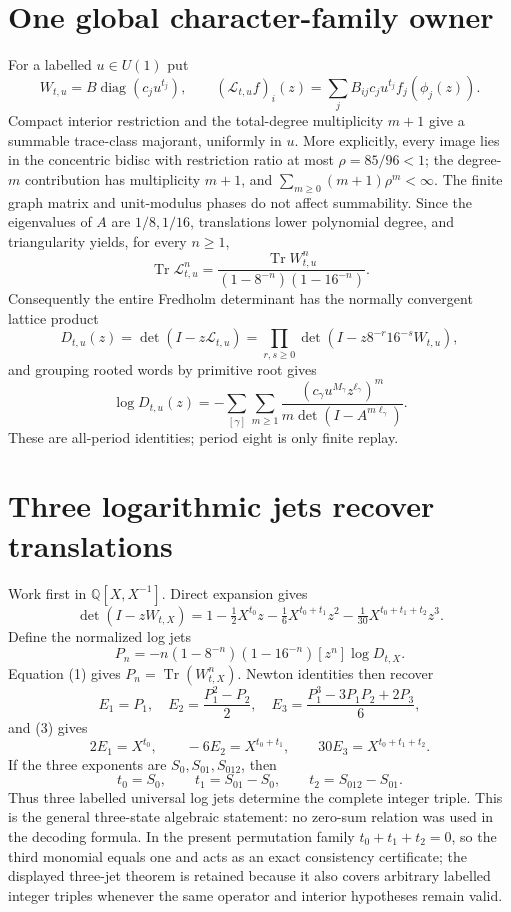 \documentclass[10pt]{article}
\begin{document}
\section{One global character-family owner}
For a labelled $u\in U(1)$ put
\[
W_{t,u}=B\operatorname{diag}(c_ju^{t_j}),\qquad
(\mathcal L_{t,u}f)_i(z)=\sum_jB_{ij}c_ju^{t_j}f_j(\phi_j(z)).
\]
Compact interior restriction and the total-degree multiplicity $m+1$ give a
summable trace-class majorant, uniformly in $u$.  More explicitly, every
image lies in the concentric bidisc with restriction ratio at most
$\rho=85/96<1$; the degree-$m$ contribution has multiplicity $m+1$, and
$\sum_{m\geq0}(m+1)\rho^m<\infty$.  The finite graph matrix and unit-modulus
phases do not affect summability.  Since the eigenvalues of $A$ are
$1/8,1/16$, translations lower polynomial degree, and triangularity yields,
for every $n\geq1$,
\begin{equation}
\operatorname{Tr}\mathcal L_{t,u}^n=
\frac{\operatorname{Tr}W_{t,u}^n}
{(1-8^{-n})(1-16^{-n})}. \tag{1}
\end{equation}
Consequently the entire Fredholm determinant has the normally convergent
lattice product
\begin{equation}
D_{t,u}(z)=\det(I-z\mathcal L_{t,u})=
\prod_{r,s\geq0}\det(I-z8^{-r}16^{-s}W_{t,u}), \tag{2}
\end{equation}
and grouping rooted words by primitive root gives
\[
\log D_{t,u}(z)=-\sum_{[\gamma]}\sum_{m\geq1}
\frac{(c_\gamma u^{M_\gamma}z^{\ell_\gamma})^m}
{m\det(I-A^{m\ell_\gamma})}.
\]
These are all-period identities; period eight is only finite replay.

\section{Three logarithmic jets recover translations}
Work first in $\mathbb Q[X,X^{-1}]$.  Direct expansion gives
\begin{equation}
\det(I-zW_{t,X})=1-\tfrac12X^{t_0}z
-\tfrac16X^{t_0+t_1}z^2-\tfrac1{30}X^{t_0+t_1+t_2}z^3. \tag{3}
\end{equation}
Define the normalized log jets
\[
P_n=-n(1-8^{-n})(1-16^{-n})[z^n]\log D_{t,X}.
\]
Equation (1) gives $P_n=\operatorname{Tr}(W_{t,X}^n)$.  Newton identities
then recover
\[
E_1=P_1,\quad E_2=\frac{P_1^2-P_2}{2},\quad
E_3=\frac{P_1^3-3P_1P_2+2P_3}{6},
\]
and (3) gives
\[
2E_1=X^{t_0},\qquad -6E_2=X^{t_0+t_1},\qquad
30E_3=X^{t_0+t_1+t_2}.
\]
If the three exponents are $S_0,S_{01},S_{012}$, then
\[
t_0=S_0,\qquad t_1=S_{01}-S_0,\qquad
t_2=S_{012}-S_{01}.
\]
Thus three labelled universal log jets determine the complete integer triple.
This is the general three-state algebraic statement: no zero-sum relation was
used in the decoding formula.  In the present permutation family
$t_0+t_1+t_2=0$, so the third monomial equals one and acts as an exact
consistency certificate; the displayed three-jet theorem is retained because
it also covers arbitrary labelled integer triples whenever the same operator
and interior hypotheses remain valid.
\end{document}
